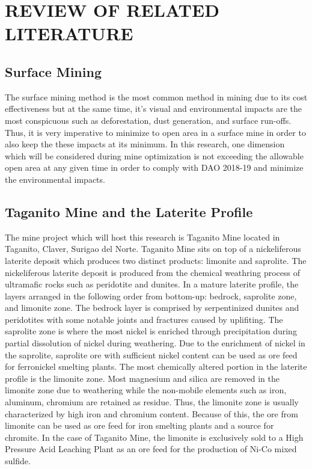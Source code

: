 \documentclass[12pt]{report}
\begin{document}
\chapter{REVIEW OF RELATED LITERATURE}

\section{Surface Mining}

The surface mining method is the most common method in mining due to its cost effectiveness but at the same time, it's visual and environmental impacts are the most conspicuous such as deforestation, dust generation, and surface run-offs.
Thus, it is very imperative to minimize to open area in a surface mine in order to also keep the these impacts at its minimum.
In this research, one dimension which will be considered during mine optimization is not exceeding the allowable open area at any given time in order to comply with DAO 2018-19 and minimize the environmental impacts.

\section{Taganito Mine and the Laterite Profile}

The mine project which will host this research is Taganito Mine located in Taganito, Claver, Surigao del Norte.
Taganito Mine sits on top of a nickeliferous laterite deposit which produces two distinct products: limonite and saprolite.
The nickeliferous laterite deposit is produced from the chemical weathring process of ultramafic rocks such as peridotite and dunites.
In a mature laterite profile, the layers arranged in the following order from bottom-up: bedrock, saprolite zone, and limonite zone.
The bedrock layer is comprised by serpentinized dunites and peridotites with some notable joints and fractures caused by uplifiting.
The saprolite zone is where the most nickel is enriched through precipitation during partial dissolution of nickel during weathering.
Due to the enrichment of nickel in the saprolite, saprolite ore with sufficient nickel content can be used as ore feed for ferronickel smelting plants.
The most chemically altered portion in the laterite profile is the limonite zone.
Most magnesium and silica are removed in the limonite zone due to weathering while the non-mobile elements such as iron, aluminum, chromium are retained as residue.
Thus, the limonite zone is usually characterized by high iron and chromium content.
Because of this, the ore from limonite can be used as ore feed for iron smelting plants and a source for chromite.
In the case of Taganito Mine, the limonite is exclusively sold to a High Pressure Acid Leaching Plant as an ore feed for the production of Ni-Co mixed sulfide.
\end{document}
